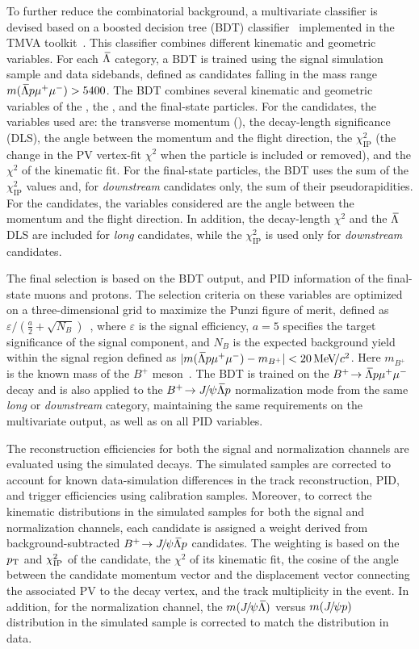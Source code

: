 To further reduce the combinatorial background, a multivariate classifier is devised based on a
 boosted decision tree (BDT) classifier~\cite{Breiman,AdaBoost} implemented in the TMVA toolkit~\cite{Hocker:2007ht,*TMVA4}. This classifier combines different kinematic and geometric variables. For each ${\kern 0.18em\overline{\kern -0.18em \Lambda}}$ category, a BDT is trained using the signal simulation sample and data sidebands, defined as candidates falling in the mass range $m({\kern 0.18em\overline{\kern -0.18em \Lambda}} p {\mu^+\mu^-})> 5400$\mevcc.
The BDT combines several kinematic and geometric variables of the \Bp, the \lamb, and the final-state particles.
For the \Bp candidates, the variables used are: the transverse momentum (\pt), the decay-length significance (DLS), the angle between the momentum and the flight direction, the $\chi^{2}_{\mathrm{IP}}$ (the change in the PV vertex-fit $\chi^{2}$ when the particle is included or removed), and the $\chi^{2}$ of the kinematic fit.
For the final-state particles, the BDT uses the sum of the $\chi^{2}_{\mathrm{IP}}$ values and, for \emph{downstream} candidates only, the sum of their pseudorapidities.
For the \lamb candidates, the variables considered are the angle between the momentum and the flight direction. In addition, the decay-length $\chi^{2}$ and the ${\kern 0.18em\overline{\kern -0.18em \Lambda}}$ DLS
are included for \emph{long} candidates, while the $\chi^{2}_{\mathrm{IP}}$ is used only for \emph{downstream} candidates.


The final selection is based on the BDT output, and PID information of the final-state muons and protons. The selection criteria on these variables are optimized on a three-dimensional grid to maximize the Punzi figure of merit, defined as ${\varepsilon}/({\frac{a}{2}+\sqrt{N_B}})$~\cite{Punzi:2003bu}, where  $\varepsilon$ is the signal efficiency, $a=5$ specifies the target significance of the signal component, and $N_B$ is the expected background yield within the signal region defined as $| m({\kern 0.18em\overline{\kern -0.18em \Lambda}} p{\mu^+\mu^-})-m_{B^+}|<20\text{\,Me\kern -0.1em V\!/}c^2$. Here $m_{B^+}$ is the known mass of the $B^+$ meson~\cite{PDG2024}.
The BDT is trained on the $\mbox{\ensuremath{B^{+}\!\rightarrow {\ensuremath{\kern 0.18em\overline{\kern -0.18em \Lambda}}} p \mu^{+} \mu^{-}}}$ decay and is also applied to the $\mbox{\ensuremath{B^{+}\!\rightarrow {\ensuremath{{J\mskip -3mu/\mskip -2mu\psi}}} {\ensuremath{\kern 0.18em\overline{\kern -0.18em \Lambda}}} p}}$ normalization mode from the same \emph{long} or \emph{downstream} category, maintaining the same requirements on the multivariate output, as well as on all PID variables.



The reconstruction efficiencies for both the signal and normalization channels are evaluated using the simulated decays.
The simulated samples are corrected to account for known data-simulation differences in the track reconstruction, PID, and trigger efficiencies using calibration samples. Moreover, to correct the kinematic distributions in the simulated samples for both the signal and
normalization channels, each candidate is assigned a weight derived from background-subtracted \mbox{$\mbox{\ensuremath{B^{+}\!\rightarrow {\ensuremath{{J\mskip -3mu/\mskip -2mu\psi}}} {\ensuremath{\kern 0.18em\overline{\kern -0.18em \Lambda}}} p}}$} candidates. The weighting is based on the $p_{\mathrm{T}}$ and $\chi^2_{\text{IP}}$ of the \Bp candidate, the $\chi^2$ of its kinematic fit, the cosine of the angle between the \Bp candidate momentum vector and the displacement vector connecting the associated PV to the \Bp decay vertex, and the track multiplicity in the event.
In addition, for the normalization channel, the $m({{J\mskip -3mu/\mskip -2mu\psi}}{\kern 0.18em\overline{\kern -0.18em \Lambda}})$ versus $m({{J\mskip -3mu/\mskip -2mu\psi}} p)$ distribution in the simulated sample is corrected to match the distribution in data.

